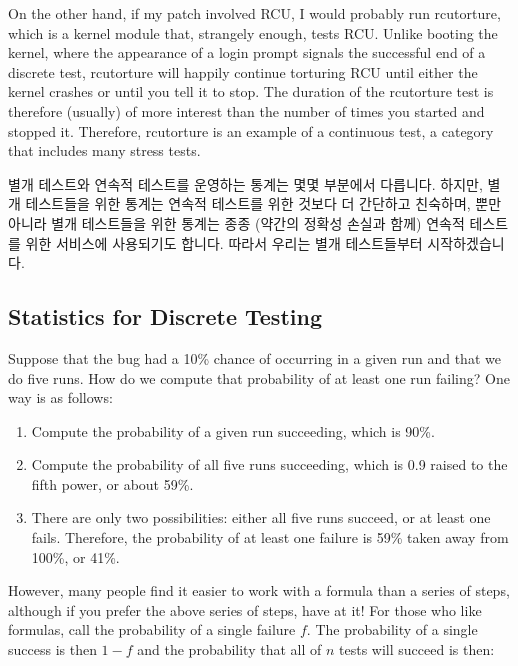 On the other hand, if my patch involved RCU, I would probably run
rcutorture, which is a kernel module that, strangely enough, tests RCU.
Unlike booting the kernel, where the appearance of a login prompt
signals the successful end of a discrete test, rcutorture will happily
continue torturing RCU until either the kernel crashes or until you
tell it to stop.
The duration of the rcutorture test is therefore (usually) of more
interest than the number of times you started and stopped it.
Therefore, rcutorture is an example of a continuous test, a category
that includes many stress tests.
\fi

별개 테스트와 연속적 테스트를 운영하는 통계는 몇몇 부분에서 다릅니다.
하지만, 별개 테스트들을 위한 통계는 연속적 테스트를 위한 것보다 더 간단하고
친숙하며, 뿐만아니라 별개 테스트들을 위한 통계는 종종 (약간의 정확성 손실과
함께) 연속적 테스트를 위한 서비스에 사용되기도 합니다.
따라서 우리는 별개 테스트들부터 시작하겠습니다.

\subsection{Statistics for Discrete Testing}
\label{sec:debugging:Statistics for Discrete Testing}

Suppose that the bug had a 10\% chance of occurring in
a given run and that we do five runs.
How do we compute that probability of at least one run failing?
One way is as follows:

\begin{enumerate}
\item	Compute the probability of a given run succeeding, which is 90\%.
\item	Compute the probability of all five runs succeeding, which
	is 0.9 raised to the fifth power, or about 59\%.
\item	There are only two possibilities: either all five runs succeed,
	or at least one fails.
	Therefore, the probability of at least one failure is
	59\% taken away from 100\%, or 41\%.
\end{enumerate}

However, many people find it easier to work with a formula than a series
of steps, although if you prefer the above series of steps, have at it!
For those who like formulas, call the probability of a single failure $f$.
The probability of a single success is then $1-f$ and the probability
that all of $n$ tests will succeed is then:

